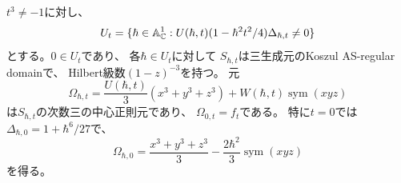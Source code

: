 \begin{theorem}[Hesse中心三次式の閉公式]
\label{thm:explicit-hesse-center}
$t^3\ne-1$に対し、
\begin{equation}
 U_t=\{\hbar\in\mathbb A^1_{\mathbb C}:
   U(\hbar,t)(1-\hbar^2t^2/4)\Delta_{\hbar,t}\ne0\}
\end{equation}
とする。$0\in U_t$であり、
各$\hbar\in U_t$に対して
$S_{\hbar,t}$は三生成元のKoszul AS-regular domainで、
Hilbert級数$(1-z)^{-3}$を持つ。
元
\begin{equation}
 \boxed{\quad
 \Omega_{\hbar,t}=
   \frac{U(\hbar,t)}3(x^3+y^3+z^3)
   +W(\hbar,t)\operatorname{sym}(xyz)
 \quad}
 \label{eq:hesse-central-element}
\end{equation}
は$S_{\hbar,t}$の次数三の中心正則元であり、
$\Omega_{0,t}=f_t$である。
特に$t=0$では
$\Delta_{\hbar,0}=1+\hbar^6/27$で、
\begin{equation}
 \Omega_{\hbar,0}
 =\frac{x^3+y^3+z^3}{3}
   -\frac{2\hbar^2}{3}\operatorname{sym}(xyz)
\end{equation}
を得る。
\end{theorem}
